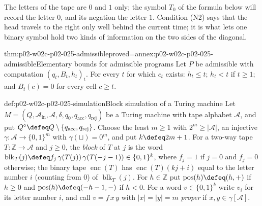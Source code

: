 The letters of the tape are \(0\) and \(1\) only; the symbol \(T_0\) of the
formula below will record the letter \(0\), and its negation the letter \(1\).
Condition (N2) says that the head travels to the right only well behind the
current time; it is what lets one binary symbol hold two kinds of information
on the two sides of the diagonal.

\begin{hblemma}{thm:p02-w02c-p02-025-admissible}{proved=annex:p02-w02c-p02-025-admissible}{Elementary bounds for admissible programs}
Let \(P\) be admissible with computation \((q_t,B_t,h_t)_t\).  For every \(t\)
for which \(c_t\) exists: \(h_t\leq t\); \(h_t<t\) if \(t\geq1\); and
\(B_t(c)=0\) for every cell \(c\geq t\).
\end{hblemma}

\begin{hbdefinition}{def:p02-w02c-p02-025-simulation}{Block simulation of a Turing machine}
Let \(M=(Q,\mathcal A_{\mathrm{in}},\mathcal A,\delta,q_0,q_{\mathrm{acc}},
q_{\mathrm{rej}})\) be a Turing machine with tape alphabet \(\mathcal A\), and
put \(Q^{\circ}\defeq Q\setminus\{q_{\mathrm{acc}},q_{\mathrm{rej}}\}\).  Choose
the least \(m\geq1\) with \(2^m\geq\lvert\mathcal A\rvert\), an injective
\(\gamma:\mathcal A\to\{0,1\}^m\) with \(\gamma(\sqcup)=0^m\), and put
\(k\defeq2m+1\).  For a two-way tape \(T:\mathbb Z\to\mathcal A\) and \(j\geq0\),
the \emph{block} of \(T\) at \(j\) is the word
\(\operatorname{blk}_T(j)\defeq f_j\,\gamma(T(j))\,\gamma(T(-j-1))\in\{0,1\}^k\),
where \(f_j=1\) if \(j=0\) and \(f_j=0\) otherwise; the binary tape
\(\operatorname{enc}(T)\) has \(\operatorname{enc}(T)(kj+i)\) equal to the
letter number \(i\) (counting from \(0\)) of \(\operatorname{blk}_T(j)\).
For \(h\in\mathbb Z\) put \(\operatorname{pos}(h)\defeq(h,+)\) if \(h\geq0\)
and \(\operatorname{pos}(h)\defeq(-h-1,-)\) if \(h<0\).  For a word
\(v\in\{0,1\}^k\) write \(v_i\) for its letter number \(i\), and call \(v=f\,x\,y\)
with \(\lvert x\rvert=\lvert y\rvert=m\) \emph{proper} if
\(x,y\in\gamma[\mathcal A]\).


\end{hbdefinition}
